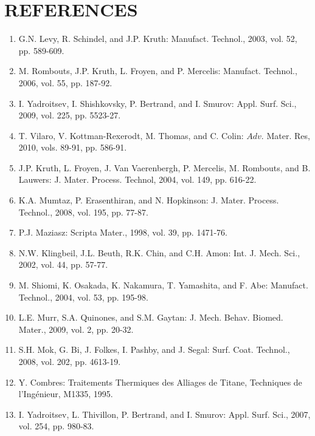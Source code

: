 \documentclass[10pt]{article}
\begin{document}
\section*{REFERENCES}
\begin{enumerate}
  \item G.N. Levy, R. Schindel, and J.P. Kruth: Manufact. Technol., 2003, vol. 52, pp. 589-609.

  \item M. Rombouts, J.P. Kruth, L. Froyen, and P. Mercelis: Manufact. Technol., 2006, vol. 55, pp. 187-92.

  \item I. Yadroitsev, I. Shishkovsky, P. Bertrand, and I. Smurov: Appl. Surf. Sci., 2009, vol. 225, pp. 5523-27.

  \item T. Vilaro, V. Kottman-Rexerodt, M. Thomas, and C. Colin: $A d v$. Mater. Res, 2010, vols. 89-91, pp. 586-91.

  \item J.P. Kruth, L. Froyen, J. Van Vaerenbergh, P. Mercelis, M. Rombouts, and B. Lauwers: J. Mater. Process. Technol, 2004, vol. 149, pp. 616-22.

  \item K.A. Mumtaz, P. Erasenthiran, and N. Hopkinson: J. Mater. Process. Technol., 2008, vol. 195, pp. 77-87.

  \item P.J. Maziasz: Scripta Mater., 1998, vol. 39, pp. 1471-76.

  \item N.W. Klingbeil, J.L. Beuth, R.K. Chin, and C.H. Amon: Int. J. Mech. Sci., 2002, vol. 44, pp. 57-77.

  \item M. Shiomi, K. Osakada, K. Nakamura, T. Yamashita, and F. Abe: Manufact. Technol., 2004, vol. 53, pp. 195-98.

  \item L.E. Murr, S.A. Quinones, and S.M. Gaytan: J. Mech. Behav. Biomed. Mater., 2009, vol. 2, pp. 20-32.

  \item S.H. Mok, G. Bi, J. Folkes, I. Pashby, and J. Segal: Surf. Coat. Technol., 2008, vol. 202, pp. 4613-19.

  \item Y. Combres: Traitements Thermiques des Alliages de Titane, Techniques de l'Ingénieur, M1335, 1995.

  \item I. Yadroitsev, L. Thivillon, P. Bertrand, and I. Smurov: Appl. Surf. Sci., 2007, vol. 254, pp. 980-83.


\end{enumerate}
\end{document}
